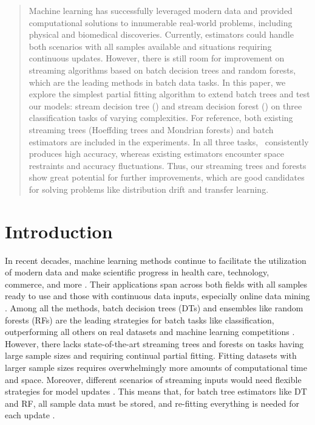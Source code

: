 \begin{abstract}
%
Machine learning has successfully leveraged modern data and provided computational solutions to innumerable real-world problems, including physical and biomedical discoveries. 
%
Currently, estimators could handle both scenarios with all samples available and situations requiring continuous updates.
%
However, there is still room for improvement on streaming algorithms based on batch decision trees and random forests, which are the leading methods in batch data tasks.
%
In this paper, we explore the simplest partial fitting algorithm to extend batch trees and test our models: stream decision tree (\SDT) and stream decision forest (\SDF) on three classification tasks of varying complexities.
For reference, both existing streaming trees (Hoeffding trees and Mondrian forests) and batch estimators are included in the experiments.
%
In all three tasks, \SDF~consistently produces high accuracy, whereas existing estimators encounter space restraints and accuracy fluctuations. Thus, our streaming trees and forests show great potential for further improvements, which are good candidates for solving problems like distribution drift and transfer learning.
\end{abstract}

\section{Introduction}
\label{introduction}
In recent decades, machine learning methods continue to facilitate the utilization of modern data and make scientific progress in health care, technology, commerce, and more \citep{Jordan2015}. Their applications span across both fields with all samples ready to use and those with continuous data inputs, especially online data mining \citep{hoeffding}. 
Among all the methods, batch decision trees (DTs) and ensembles like random forests (RFs) are the leading strategies for batch tasks like classification, outperforming all others on real datasets and machine learning competitions \citep{Caruana2006-wp, Caruana2008-tb, JMLR:v15:delgado14a, Chen2016-fx}.
However, there lacks state-of-the-art streaming trees and forests on tasks having large sample sizes and requiring continual partial fitting.
Fitting datasets with larger sample sizes requires overwhelmingly more amounts of computational time and space. Moreover, different scenarios of streaming inputs would need flexible strategies for model updates \citep{abdulsalam07st}. This means that, for batch tree estimators like DT and RF, all sample data must be stored, and re-fitting everything is needed for each update \citep{Amit1997, breiman2001random}. 

